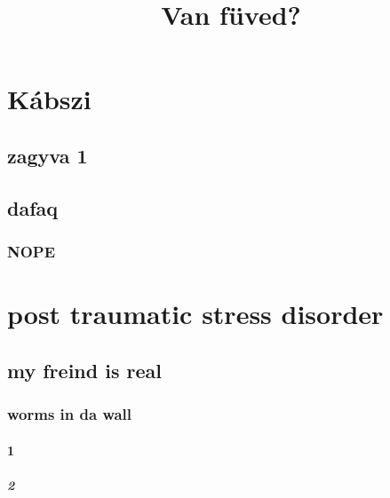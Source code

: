 \documentclass{article}
\title{Van füved?}
\begin{document}
\maketitle
\setcounter{secnumdepth}{10}
\section{Kábszi}
\subsection{zagyva 1}
\hulipsum[3]
\subsection{dafaq}
\hulipsum[4]
\subsubsection{NOPE}
\hulipsum[1]
\section[ptsd]{post traumatic stress disorder}
\subsection{my freind is real}
\subsubsection{worms in da wall}
\paragraph{1}
\subparagraph{2}
\hulipsum[2]
\end{document}
